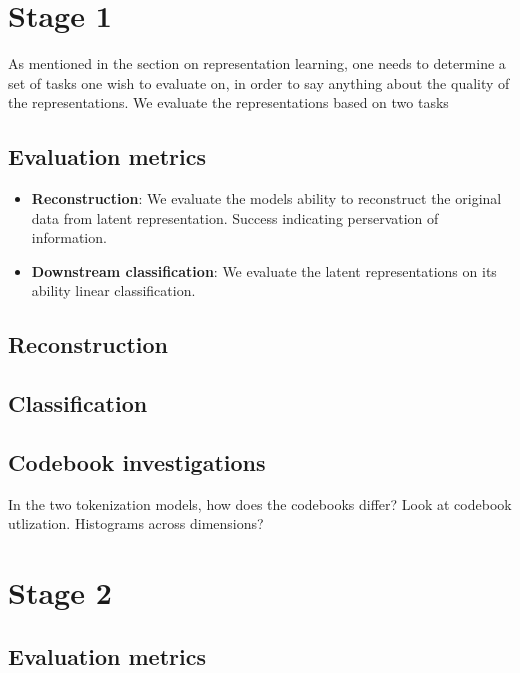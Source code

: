 \documentclass[../../thesis.tex]{subfiles}
\begin{document}
\section{Stage 1}

As mentioned in the section on representation learning, one needs to determine a set of tasks one wish to evaluate on, in order to say anything about the quality of the representations. We evaluate the representations based on two tasks

\subsection{Evaluation metrics}

\begin{itemize}
    \item \textbf{Reconstruction}: We evaluate the models ability to reconstruct the original data from latent representation. Success indicating perservation of information.
    \item \textbf{Downstream classification}: We evaluate the latent representations on its ability  linear classification. 
\end{itemize}

\subsection{Reconstruction}

\subsection{Classification}

\subsection{Codebook investigations}

In the two tokenization models, how does the codebooks differ? Look at codebook utlization. Histograms across dimensions?  

\section{Stage 2}

\subsection{Evaluation metrics}
\end{document}
